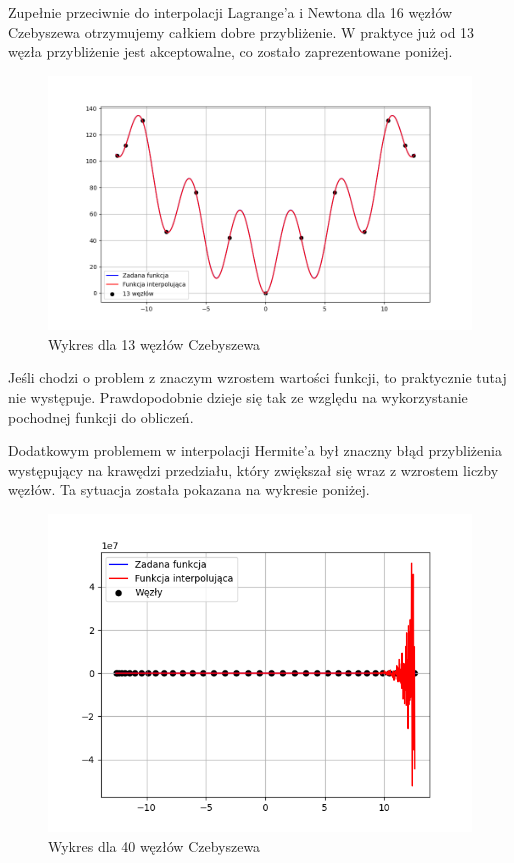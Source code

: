 \documentclass{article}
\begin{document}
Zupełnie przeciwnie do interpolacji Lagrange'a i Newtona dla 16 węzłów Czebyszewa otrzymujemy całkiem dobre przybliżenie. W praktyce już od 13 węzła przybliżenie jest akceptowalne, co zostało zaprezentowane poniżej.

\begin{figure}[H]
\centering
  \begin{minipage}[b]{0.49\textwidth}
    \includegraphics[width=\textwidth]{img15_n=13.png}
    \caption{Wykres dla 13 węzłów Czebyszewa}
  \end{minipage}
\end{figure}

Jeśli chodzi o problem z znaczym wzrostem wartości funkcji, to praktycznie tutaj nie występuje. Prawdopodobnie dzieje się tak ze względu na wykorzystanie pochodnej funkcji do obliczeń.

Dodatkowym problemem w interpolacji Hermite'a był znaczny błąd przybliżenia występujący na krawędzi przedziału, który zwiększał się wraz z wzrostem liczby węzłów. Ta sytuacja została pokazana na wykresie poniżej.

\begin{figure}[H]
\centering
  \begin{minipage}[b]{0.49\textwidth}
    \includegraphics[width=\textwidth]{img18.png}
    \caption{Wykres dla 40 węzłów Czebyszewa}
  \end{minipage}
\end{figure}
\end{document}
